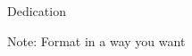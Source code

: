 \clearpage
{}  %
\begin{centering}
Dedication\\
\end{centering}

\noindent  Note: Format in a way you want \\

\lipsum[1]